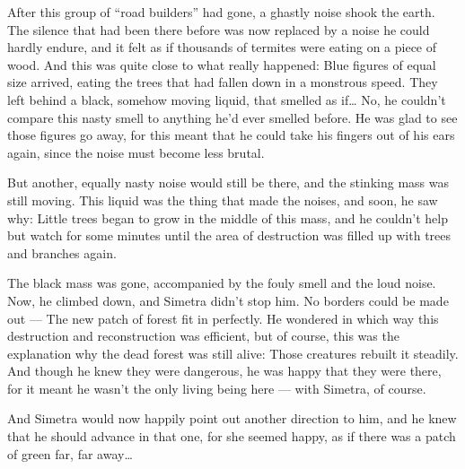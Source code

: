 After this group of \enquote{road builders} had gone, a ghastly noise shook the earth. The silence that had been there before was now replaced by a noise he could hardly endure, and it felt as if thousands of termites were eating on a piece of wood. 
And this was quite close to what really happened: Blue figures of equal size arrived, eating the trees that had fallen down in a monstrous speed. They left behind a black, somehow moving liquid, that smelled as if\dots{}
No, he couldn't compare this nasty smell to anything he'd ever smelled before. He was glad to see those figures go away, for this meant that he could take his fingers out of his ears again, since the noise must become less brutal.

But another, equally nasty noise would still be there, and the stinking mass was still moving. This liquid was the thing that made the noises, and soon, he saw why: Little trees began to grow in the middle of this mass, and he couldn't help but watch for some minutes until the area of destruction was filled up with trees and branches again.

The black mass was gone, accompanied by the fouly smell and the loud noise. Now, he climbed down, and Simetra didn't stop him. No borders could be made out --- The new patch of forest fit in perfectly. He wondered in which way this destruction and reconstruction was efficient, but of course, this was the explanation why the dead forest was still alive: Those creatures rebuilt it steadily. 
And though he knew they were dangerous, he was happy that they were there, for it meant he wasn't the only living being here --- with Simetra, of course.

And Simetra would now happily point out another direction to him, and he knew that he should advance in that one, for she seemed happy, as if there was a patch of green far, far away\dots{}
